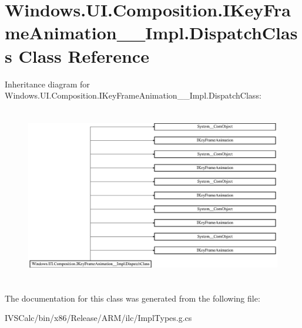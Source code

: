 \hypertarget{class_windows_1_1_u_i_1_1_composition_1_1_i_key_frame_animation_____impl_1_1_dispatch_class}{}\section{Windows.\+U\+I.\+Composition.\+I\+Key\+Frame\+Animation\+\_\+\+\_\+\+Impl.\+Dispatch\+Class Class Reference}
\label{class_windows_1_1_u_i_1_1_composition_1_1_i_key_frame_animation_____impl_1_1_dispatch_class}
Inheritance diagram for Windows.\+U\+I.\+Composition.\+I\+Key\+Frame\+Animation\+\_\+\+\_\+\+Impl.\+Dispatch\+Class\+:\begin{figure}[H]
\begin{center}
\leavevmode
\includegraphics[height=7.758186cm]{class_windows_1_1_u_i_1_1_composition_1_1_i_key_frame_animation_____impl_1_1_dispatch_class}
\end{center}
\end{figure}


The documentation for this class was generated from the following file\+:\begin{DoxyCompactItemize}
\item 
I\+V\+S\+Calc/bin/x86/\+Release/\+A\+R\+M/ilc/Impl\+Types.\+g.\+cs\end{DoxyCompactItemize}
